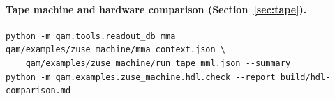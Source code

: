 \paragraph{Tape machine and hardware comparison (Section~\ref{sec:tape}).}
\begin{lstlisting}
python -m qam.tools.readout_db mma qam/examples/zuse_machine/mma_context.json \
    qam/examples/zuse_machine/run_tape_mml.json --summary
python -m qam.examples.zuse_machine.hdl.check --report build/hdl-comparison.md
\end{lstlisting}

